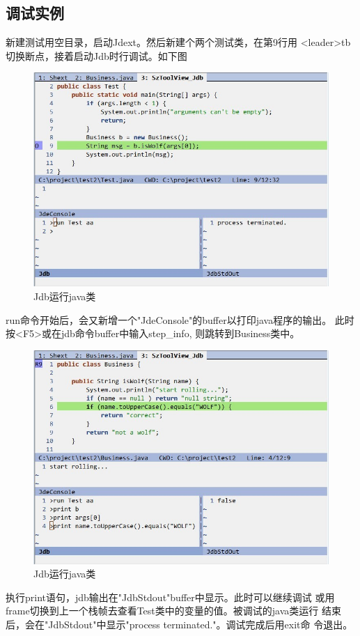 \documentclass[oneside,openany]{book}
\begin{document}
  \subsection{调试实例}
  新建测试用空目录，启动Jdext。然后新建个两个测试类，在第9行用
<leader>tb切换断点，接着启动Jdb时行调试。如下图
  \FloatBarrier
  \begin{figure}[H]%
  \centering
  \includegraphics[scale=0.5]{jdb-run.jpg}
  \caption{Jdb运行java类}
  \end{figure}
  run命令开始后，会又新增一个"JdeConsole"的buffer以打印java程序的输出。
  此时按<F5>或在jdb命令buffer中输入step\_info, 则跳转到Business类中。
  \FloatBarrier
  \begin{figure}[H]%
  \centering
  \includegraphics[scale=0.5]{jdb-print2.jpg}
  \caption{Jdb运行java类}
  \end{figure}
  执行print语句，jdb输出在"JdbStdout"buffer中显示。此时可以继续调试
或用frame切换到上一个栈帧去查看Test类中的变量的值。被调试的java类运行
结束后，会在"JdbStdout"中显示"process terminated."。调试完成后用exit命
令退出。
\end{document}
